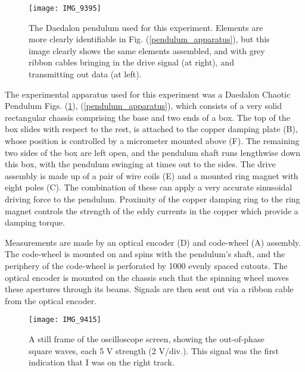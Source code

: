 \documentclass[12pt,twoside]{reedthesis}
\begin{document}
\begin{figure}[h]
\centering
\texttt{[image: IMG\_9395]} 
\caption{The Daedalon pendulum used for this experiment.  Elements are more clearly identifiable in Fig. (\ref{pendulum_apparatus}), but this image clearly shows the same elements assembled, and with grey ribbon cables bringing in the drive signal (at right), and transmitting out data (at left).}
\label{pendulum_photo}
\end{figure}

The experimental apparatus used for this experiment was a Daedalon Chaotic Pendulum Figs. (\ref{pendulum_photo}), (\ref{pendulum_apparatus}), which consists of a very solid rectangular chassis comprising the base and two ends of a box.  The top of the box slides with respect to the rest, is attached to the copper damping plate (B), whose position is controlled by a micrometer mounted above (F).  The remaining two sides of the box are left open, and the pendulum shaft runs lengthwise down this box, with the pendulum swinging at times out to the sides.  The drive assembly is made up of a pair of wire coils (E) and a mounted ring magnet with eight poles (C).  The combination of these can apply a very accurate sinusoidal driving force to the pendulum.  Proximity of the copper damping ring to the ring magnet controls the strength of the eddy currents in the copper which provide a damping torque.  

Measurements are made by an optical encoder (D) and code-wheel (A) assembly.   The code-wheel is mounted on and spins with the pendulum's shaft, and the periphery of the code-wheel is perforated by 1000 evenly spaced cutouts.  The optical encoder is mounted on the chassis such that the spinning wheel moves these apertures through its beams.  Signals are then sent out via a ribbon cable from the optical encoder.  

\begin{figure}[h]
\centering
\texttt{[image: IMG\_9415]} 
\caption{A still frame of the oscilloscope screen, showing the out-of-phase square waves, each 5 V strength (2 V/div.).  This signal was the first indication that I was on the right track.}
\label{square_waves}
\end{figure}

\end{document}
